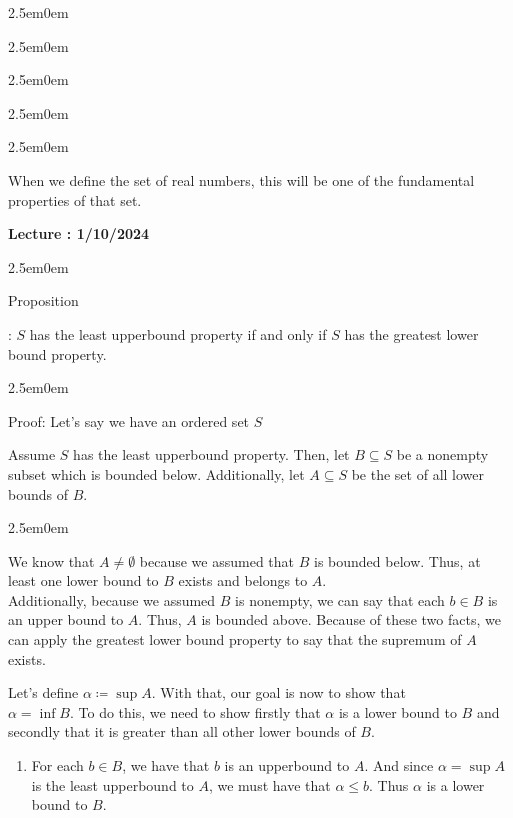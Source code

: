 \documentclass{book}
\newcommand{\hTwoOld}{%
   \color{MidnightBlue}%
   \fontsize{13}{13}\selectfont%
}
\newcommand{\hThreeOld}{%
   \color{PineGreen}
   \fontsize{13}{13}\selectfont%
}
\newcommand{\teachCommentOld}{%
   \color{Orange}%
   \fontsize{12}{12}\selectfont%
}
\newenvironment{myIndent}{%
   \begin{adjustwidth}{2.5em}{0em}%
}{%
   \end{adjustwidth}%
}
\newcommand{\retTwo}{\hfill\bigbreak}
\newcounter{LectureNumber}
\newcommand*{\markLecture}[1]{%
   \stepcounter{LectureNumber}%
   {\huge \color{Black} \textbf{Lecture \theLectureNumber: #1} \newline}%
}
\newcounter{PropNumber}
\newcommand{\propCount}[1][1]{%
   \addtocounter{PropNumber}{#1}%
   \thePropNumber%
}
\begin{document}
   \begin{myIndent}\begin{myIndent}\begin{myIndent}
   \begin{myIndent}\begin{myIndent}
      \teachCommentOld
      When we define the set of real numbers, this will be one of the
      fundamental properties of that set. \hfill \bigbreak
   \end{myIndent}\end{myIndent}\end{myIndent}
   \end{myIndent}\end{myIndent}

   \markLecture{1/10/2024}
   \begin{myIndent}
      \hTwoOld
      Proposition \propCount: $S$ has the least upperbound property if
      and only if $S$ has the greatest lower bound property.
      
      \hThreeOld
      \begin{myIndent}
         Proof: Let's say we have an ordered set $S$
         \hfill \bigbreak

         Assume $S$ has the least upperbound property. Then, let
         $B \subseteq S$ be a nonempty subset which is bounded below.
         Additionally, let $A \subseteq S$ be the set of all lower bounds
         of $B$. \newpage
         
         \begin{myIndent}
            We know that $A \neq \emptyset$ because we assumed that $B$ is
            bounded below. Thus, at least one lower bound to $B$ exists and
            belongs to $A$. \\Additionally, because we assumed $B$ is nonempty,
            we can say that each $b \in B$ is an upper bound to $A$. Thus, $A$
            is bounded above. Because of these two facts, we can apply the
            greatest lower bound property to say that the supremum of $A$ 
            exists. \hfill \bigbreak
   
            Let's define $\alpha \coloneq \sup{A}$. With that, our goal is 
            now to show that\\ $\alpha = \inf{B}$. To do this, we need to 
            show firstly that $\alpha$ is a lower bound to $B$ and 
            secondly that it is greater than all other lower bounds of $B$.
            \retTwo
            \begin{enumerate}
               \item For each $b \in B$, we have that $b$ is an 
                  upperbound to $A$. And since $\alpha = \sup{A}$ is the
                  least upperbound to $A$, we must have that $\alpha \leq
                  b$. Thus $\alpha$ is a lower bound to $B$. \retTwo
               

\end{enumerate}
\end{myIndent}
\end{myIndent}
\end{myIndent}
\end{document}
